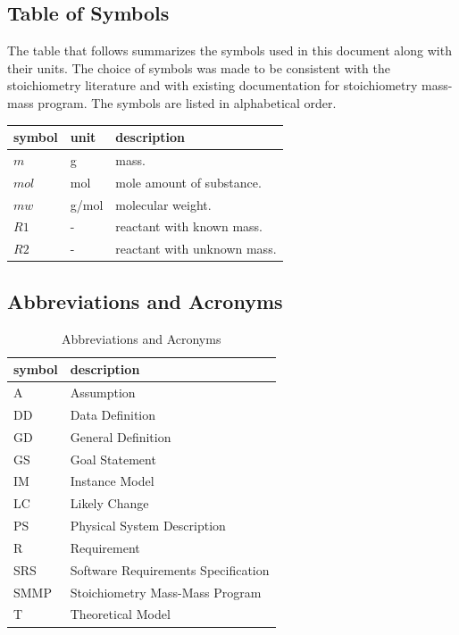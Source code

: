 \documentclass[12pt]{article}
\begin{document}
\subsection{Table of Symbols}

The table that follows summarizes the symbols used in this document along with
their units. The choice of symbols was made to be consistent with the stoichiometry 
literature and with existing documentation for stoichiometry mass-mass program. The symbols are listed in alphabetical order.

\renewcommand{\arraystretch}{1.2}
\noindent \begin{longtable*}{l l p{12cm}} \toprule
\endlastfoot
\textbf{symbol} & \textbf{unit} & \textbf{description}\\
\midrule 
$m$ & \si[per-mode=symbol] {\gram} & mass.\\
$mol$ & \si[per-mode=symbol] {\mol} & mole amount of substance.\\ 
$mw$ & \si[per-mode=symbol] {\gram/\mol} & molecular weight.\\ 
$R1$ & \si[per-mode=symbol] {-} & reactant with known mass.\\
 $R2$ & \si[per-mode=symbol] {-} & reactant with unknown mass.\\ 


\bottomrule
\end{longtable*}

\subsection{Abbreviations and Acronyms}

\renewcommand{\arraystretch}{1.2}
\begin{table}[ht]
\begin{tabular}{l l} 
  \toprule		
  \textbf{symbol} & \textbf{description}\\
  \midrule 
  A & Assumption\\
  DD & Data Definition\\
  GD & General Definition\\
  GS & Goal Statement\\
  IM & Instance Model\\
  LC & Likely Change\\
  PS & Physical System Description\\
  R & Requirement\\
  SRS & Software Requirements Specification\\
 SMMP & Stoichiometry Mass-Mass Program\\
  T & Theoretical Model\\
  \bottomrule
  \end{tabular}
  \caption{ Abbreviations and Acronyms}
 \end{table}
\end{document}
